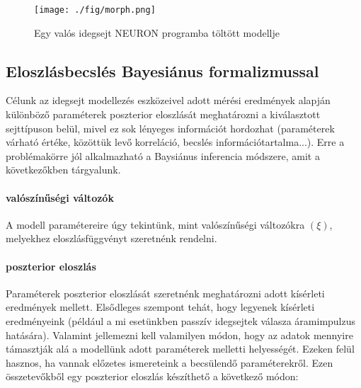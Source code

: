 \begin{figure}[!htb]
	\centering
	\texttt{[image: ./fig/morph.png]}
	\caption[Kísérletből származó morfológia]{Egy valós idegsejt NEURON programba töltött modellje}
	\label{fig:morph}
\end{figure}





\FloatBarrier
\subsection{Eloszlásbecslés Bayesiánus formalizmussal}\label{sec:bayes}
Célunk az idegsejt modellezés eszközeivel adott mérési eredmények alapján különböző paraméterek poszterior eloszlását meghatározni a kiválasztott sejttípuson belül, mivel ez sok lényeges információt hordozhat (paraméterek várható értéke, közöttük levő korreláció, becslés információtartalma...). Erre a problémakörre jól alkalmazható a Baysiánus inferencia módszere, amit a következőkben tárgyalunk.

\paragraph{valószínűségi változók}
A modell paramétereire úgy tekintünk, mint valószínűségi változókra $(\xi)$, melyekhez eloszlásfüggvényt szeretnénk rendelni.

\paragraph{poszterior eloszlás}
Paraméterek poszterior eloszlását szeretnénk meghatározni adott kísérleti eredmények mellett.
Elsődleges szempont tehát, hogy legyenek kísérleti eredményeink (például a mi esetünkben passzív idegsejtek válasza áramimpulzus hatására). Valamint jellemezni kell valamilyen módon, hogy az adatok mennyire támasztják alá a modellünk adott paraméterek melletti helyességét. Ezeken felül hasznos, ha vannak előzetes ismereteink a becsülendő paraméterekről. Ezen összetevőkből egy poszterior eloszlás készíthető a következő módon:

